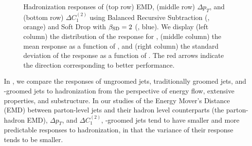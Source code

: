 \documentclass[letterpaper,11pt]{article}
\begin{document}
\begin{figure}[p]
\centering
{}
\\
\\
\caption{
    Hadronization responses of (top row) EMD, (middle row) \(\Delta p_T\), and (bottom row) \(\Delta C_1^{(2)}\) using Balanced Recursive Subtraction (, orange) and Soft Drop with \(\beta_{\rm SD} = 2\) (, blue).
    We display (left column) the distribution of the response for , (middle column) the mean response as a function of \zcut, and (right column) the standard deviation of the response as a function of \zcut.
%
The red arrows indicate the direction corresponding to better performance.
}
\label{fig:parton_hadron_response}
\end{figure}

In , we compare the responses of ungroomed jets, traditionally groomed jets, and \PIRANHA{}-groomed jets to hadronization from the perspective of energy flow, extensive properties, and substructure.
%
In our studies of the Energy Mover's Distance (EMD) between parton-level jets and their hadron level counterparts (the parton-hadron EMD), \(\Delta p_T\), and \(\Delta C_1^{(2)}\), \PIRANHA{}-groomed jets tend to have smaller and more predictable responses to hadronization, in that the variance of their response tends to be smaller.
\end{document}
